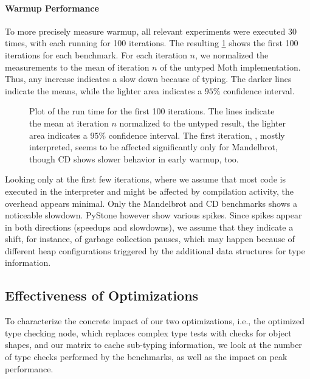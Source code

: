 \paragraph*{Warmup Performance}

To more precisely measure warmup, all relevant experiments were executed 30 times,
with each running for 100 iterations.
The resulting \cref{fig:typing-warmup} shows the first 100 iterations for each benchmark.
For each iteration $n$, we normalized the measurements to the mean of iteration $n$
of the untyped Moth implementation.
Thus, any increase indicates a slow down because of typing.
The darker lines indicate the means, while the lighter area indicates
a $95\%$ confidence interval.

\begin{figure}[htb]
  \centering
  \TypingWarmupConfInterval{}
	\caption{Plot of the run time for the first 100 iterations.
           The lines indicate the mean at iteration $n$ normalized
           to the untyped result, the lighter area indicates a $95\%$ confidence interval.
           The first iteration, \ie, mostly interpreted, seems
           to be affected significantly only for Mandelbrot, though
           CD shows slower behavior in early warmup, too.}
	\label{fig:typing-warmup}
\end{figure}

Looking only at the first few iterations,
where we assume that most code is executed in the interpreter and might be
affected by compilation activity,
the overhead appears minimal.
Only the Mandelbrot and CD benchmarks shows a noticeable slowdown.
PyStone however show various spikes.
Since spikes appear in both directions (speedups and slowdowns),
we assume that they indicate a shift,
for instance, of garbage collection pauses,
which may happen because of different heap configurations
triggered by the additional data structures for type information.

\subsection{Effectiveness of Optimizations}

To characterize the concrete impact of our two optimizations, i.e.,
the optimized type checking node, which replaces complex type tests
with checks for object shapes, and our matrix to cache sub-typing information,
we look at the number of type checks performed by the benchmarks,
as well as the impact on peak performance.

